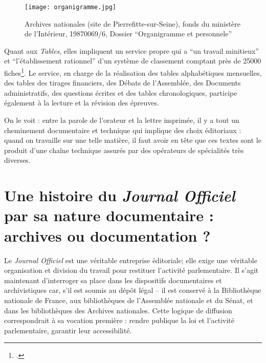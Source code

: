 \begin{figure}[htbp]
\centering
\texttt{[image: organigramme.jpg]}
\caption{Archives nationales (site de Pierrefitte-sur-Seine), fonds du ministère de l'Intérieur, 19870069/6, Dossier \enquote{Organigramme et personnele} }
\label{fig:organigramme}
\end{figure}

Quant aux \emph{Tables}, elles impliquent un service propre qui a \enquote{un travail minitieux} et \enquote{l'établissement rationnel} d'un système de classement comptant près de 25000 fiches\footcite[][]{cote6}. Le service, en charge de la réalisation des tables alphabétiques mensuelles, des tables des tirages financiers, des Débats de l'Assemblée, des Documents administratifs, des questions écrites et des tables chronologiques, participe également à la lecture et la révision des épreuves. 

On le voit : entre la parole de l'orateur et la lettre imprimée, il y a tout un cheminement documentaire et technique qui implique des choix éditoriaux : quand on travaille sur une telle matière, il faut avoir en tête que ces textes sont le produit d'une chaîne technique assurés par des opérateurs de spécialités très diverses.

\section{Une histoire du \emph{Journal Officiel} par sa nature documentaire : archives ou documentation ?}

Le \emph{Journal Officiel} est une véritable entreprise éditoriale; elle exige une véritable organisation et division du travail pour restituer l'activité parlementaire. Il s’agit maintenant d’interroger sa place dans les dispositifs documentaires et archivistiques car, s'il est soumis au dépôt légal -- il est conservé à la Bibliothèque nationale de France, aux bibliothèques de l’Assemblée nationale et du Sénat, et dans les bibliothèques des Archives nationales. Cette logique de diffusion correspondrait à sa vocation première : rendre publique la loi et l’activité parlementaire, garantir leur accessibilité.

